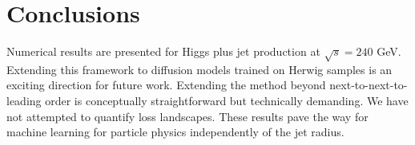 \section{Conclusions}\label{sec:conclusions}

Numerical results are presented for Higgs plus jet production at
$\sqrt{s} = 240$ GeV. Extending this framework to diffusion models
trained on Herwig samples is an exciting direction for future work.
Extending the method beyond next-to-next-to-leading order is
conceptually straightforward but technically demanding. We have not
attempted to quantify loss landscapes. These results pave the way for
machine learning for particle physics independently of the jet radius.

